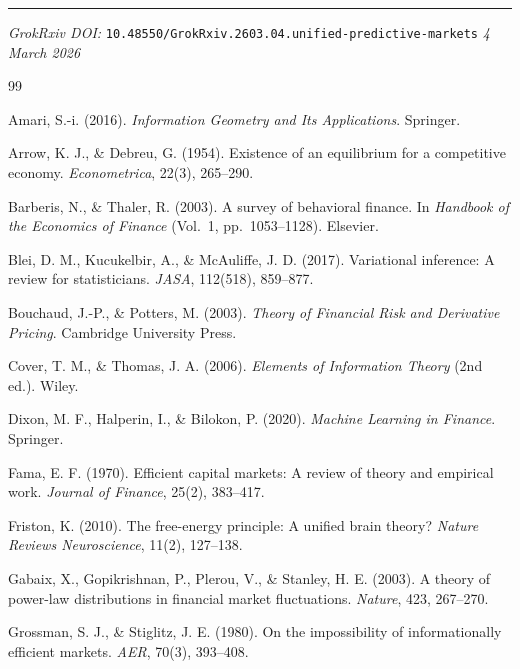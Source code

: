 \documentclass[12pt,a4paper]{article}
\theoremstyle{definition}
\begin{document}
\vspace{1em}
\noindent\rule{\textwidth}{0.5pt}
\noindent\textit{GrokRxiv DOI:} \texttt{10.48550/GrokRxiv.2603.04.unified-predictive-markets}
\hfill \textit{4 March 2026}



\begin{thebibliography}{99}

Amari, S.-i. (2016). \textit{Information Geometry and Its Applications}. Springer.

Arrow, K. J., \& Debreu, G. (1954). Existence of an equilibrium for a competitive economy. \textit{Econometrica}, 22(3), 265--290.

Barberis, N., \& Thaler, R. (2003). A survey of behavioral finance. In \textit{Handbook of the Economics of Finance} (Vol.~1, pp.~1053--1128). Elsevier.

Blei, D. M., Kucukelbir, A., \& McAuliffe, J. D. (2017). Variational inference: A review for statisticians. \textit{JASA}, 112(518), 859--877.

Bouchaud, J.-P., \& Potters, M. (2003). \textit{Theory of Financial Risk and Derivative Pricing}. Cambridge University Press.

Cover, T. M., \& Thomas, J. A. (2006). \textit{Elements of Information Theory} (2nd ed.). Wiley.

Dixon, M. F., Halperin, I., \& Bilokon, P. (2020). \textit{Machine Learning in Finance}. Springer.

Fama, E. F. (1970). Efficient capital markets: A review of theory and empirical work. \textit{Journal of Finance}, 25(2), 383--417.

Friston, K. (2010). The free-energy principle: A unified brain theory? \textit{Nature Reviews Neuroscience}, 11(2), 127--138.

Gabaix, X., Gopikrishnan, P., Plerou, V., \& Stanley, H. E. (2003). A theory of power-law distributions in financial market fluctuations. \textit{Nature}, 423, 267--270.

Grossman, S. J., \& Stiglitz, J. E. (1980). On the impossibility of informationally efficient markets. \textit{AER}, 70(3), 393--408.


\end{thebibliography}
\end{document}
